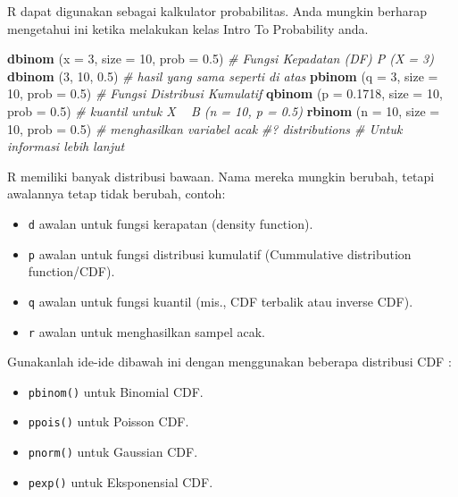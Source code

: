 \documentclass[
]{book}
\newenvironment{Shaded}{\begin{snugshade}}{\end{snugshade}}
\newcommand{\CommentTok}[1]{\textcolor[rgb]{0.56,0.35,0.01}{\textit{#1}}}
\newcommand{\DataTypeTok}[1]{\textcolor[rgb]{0.13,0.29,0.53}{#1}}
\newcommand{\DecValTok}[1]{\textcolor[rgb]{0.00,0.00,0.81}{#1}}
\newcommand{\FloatTok}[1]{\textcolor[rgb]{0.00,0.00,0.81}{#1}}
\newcommand{\KeywordTok}[1]{\textcolor[rgb]{0.13,0.29,0.53}{\textbf{#1}}}
\newcommand{\NormalTok}[1]{#1}
\providecommand{\tightlist}{%
  \setlength{\itemsep}{0pt}\setlength{\parskip}{0pt}}
\begin{document}
R dapat digunakan sebagai kalkulator probabilitas. Anda mungkin berharap mengetahui ini ketika melakukan kelas Intro To Probability anda.

\begin{Shaded}
\begin{Highlighting}[]
\KeywordTok{dbinom}\NormalTok{ (}\DataTypeTok{x =} \DecValTok{3}\NormalTok{, }\DataTypeTok{size =} \DecValTok{10}\NormalTok{, }\DataTypeTok{prob =} \FloatTok{0.5}\NormalTok{)	     }\CommentTok{# Fungsi Kepadatan (DF) P (X = 3) }
\KeywordTok{dbinom}\NormalTok{ (}\DecValTok{3}\NormalTok{, }\DecValTok{10}\NormalTok{, }\FloatTok{0.5}\NormalTok{) 				               }\CommentTok{# hasil yang sama seperti di atas}
\KeywordTok{pbinom}\NormalTok{ (}\DataTypeTok{q =} \DecValTok{3}\NormalTok{, }\DataTypeTok{size =} \DecValTok{10}\NormalTok{, }\DataTypeTok{prob =} \FloatTok{0.5}\NormalTok{) 		 }\CommentTok{# Fungsi Distribusi Kumulatif}
\KeywordTok{qbinom}\NormalTok{ (}\DataTypeTok{p =} \FloatTok{0.1718}\NormalTok{, }\DataTypeTok{size =} \DecValTok{10}\NormalTok{, }\DataTypeTok{prob =} \FloatTok{0.5}\NormalTok{) }\CommentTok{# kuantil untuk X ~ B (n = 10, p = 0.5)}
\KeywordTok{rbinom}\NormalTok{ (}\DataTypeTok{n =} \DecValTok{10}\NormalTok{, }\DataTypeTok{size =} \DecValTok{10}\NormalTok{, }\DataTypeTok{prob =} \FloatTok{0.5}\NormalTok{)	 	 }\CommentTok{# menghasilkan variabel acak}
\CommentTok{#? distributions 					                 # Untuk informasi lebih lanjut}
\end{Highlighting}
\end{Shaded}

R memiliki banyak distribusi bawaan. Nama mereka mungkin berubah, tetapi awalannya tetap tidak berubah, contoh:

\begin{itemize}
\tightlist
\item
  \texttt{d} awalan untuk fungsi kerapatan (density function).
\item
  \texttt{p} awalan untuk fungsi distribusi kumulatif (Cummulative distribution function/CDF).
\item
  \texttt{q} awalan untuk fungsi kuantil (mis., CDF terbalik atau inverse CDF).
\item
  \texttt{r} awalan untuk menghasilkan sampel acak.
\end{itemize}

Gunakanlah ide-ide dibawah ini dengan menggunakan beberapa distribusi CDF :

\begin{itemize}
\tightlist
\item
  \texttt{pbinom()} untuk Binomial CDF.
\item
  \texttt{ppois()} untuk Poisson CDF.
\item
  \texttt{pnorm()} untuk Gaussian CDF.
\item
  \texttt{pexp()} untuk Eksponensial CDF.
\end{itemize}
\end{document}
